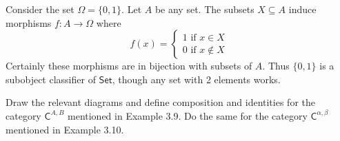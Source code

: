 \documentclass[../../master.tex]{subfiles}
\begin{document}
    \begin{solution}
      Consider the set \(\Omega = \{0, 1\}\).
    Let \(A\) be any set.
    The subsets \(X \subseteq A\) induce morphisms \(f: A \to \Omega\) where
      \begin{equation*}
        f(x) =
        \begin{cases}
          1 \text{ if } x \in X \\
          0 \text{ if } x \notin X
        \end{cases}
      \end{equation*}
      Certainly these morphisms are in bijection with subsets of \(A\).
      Thus \(\{0, 1\}\) is a subobject classifier of \(\mathsf{Set}\), though any set with 2 elements works.
    \end{solution}

    \begin{problem}
      Draw the relevant diagrams and define composition and identities for the category \(\mathsf{C}^{A, B}\) mentioned in Example 3.9.
      Do the same for the category \(\mathsf{C}^{\alpha, \beta}\) mentioned in Example 3.10.
    \end{problem}
\end{document}
